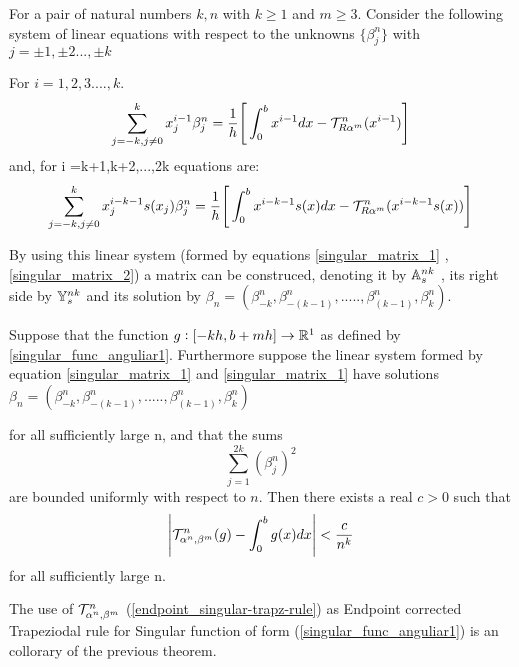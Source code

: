\documentclass[../document.tex]{subfiles}
\begin{document}
	
	For a pair of natural numbers $k,n$ with $k\geq1$ and  $m\geq3$. Consider the following system of linear 
	equations with respect to the unknowns $\{ \beta_j^n \}$ with $j = \pm1,\pm2...,\pm k$
	
	For $i =1 ,2 ,3....,k$.
	\begin{equation} \label{singular_matrix_1}
		\sum_{j=-k,j\neq0}^{k} x_j^{i-1} \beta_j^n
		= \frac{1}{h}\Bigg[ 
		\int_{0}^{b} x^{i-1}dx -\mathcal{T}_{R\alpha^m}^{n}(x^{i-1})
		\Bigg]
	\end{equation}
	and, for i =k+1,k+2,...,2k equations are:
	\begin{equation} \label{singular_matrix_2}
		\sum_{j=-k,j\neq0}^{k} 
		x_j^{i-k-1} s(x_j) \beta_j^n
		= \frac{1}{h}\Bigg[ 
		\int_{0}^{b} x^{i-k-1}s(x)dx -
		\mathcal{T}_{R\alpha^m}^{n}(x^{i-k-1}s(x))
		\Bigg]
	\end{equation}
	
	
	By using this linear system (formed by equations \ref{singular_matrix_1}  ,\ref{singular_matrix_2}) a matrix can be construced, denoting it by $\mathbb{A}^{nk}_{s}$ , its right side by $\mathbb{Y}^{nk}_{s}$ and its solution by 
	$
	\beta_n = ( \beta_{-k}^{n} ,\beta_{-(k-1)}^{n},..... 
	,\beta_{(k-1)}^{n} ,\beta_{k}^{n} ).
	$
	
	\begin{theorem}         \label{theorem_4_2}
		Suppose that the function $g:[-kh,b+mh]\rightarrow\mathbb{R}^1$ as defined by \ref{singular_func_anguliar1}. Furthermore suppose the linear system formed by equation \ref{singular_matrix_1} and \ref{singular_matrix_1}
		have solutions
		$
		\beta_n = ( \beta_{-k}^{n} ,\beta_{-(k-1)}^{n},..... 
		,\beta_{(k-1)}^{n} ,\beta_{k}^{n} )
		$		
		
		for all sufficiently large n, and that the sums
		\begin{equation}
			\sum_{j=1}^{2k} (\beta_j^n)^2
		\end{equation}
		are bounded uniformly with respect to $n$. Then there exists a real 
		$c > 0$ such that
		\begin{equation}
			\Bigg|	\mathcal{T}_{\alpha^n,\beta^m}^{n} (g) - \int_{0}^{b} g(x) dx\Bigg|
			< \frac{c}{n^k}
		\end{equation}
		for all sufficiently large n.
		
		
	\end{theorem}
	The use of $\mathcal{T}_{\alpha^n,\beta^m}^{n}$ (\ref{endpoint_singular-trapz-rule}) as Endpoint corrected Trapeziodal rule for Singular function of form (\ref{singular_func_anguliar1}) is an collorary of the previous theorem.
	
\end{document}
